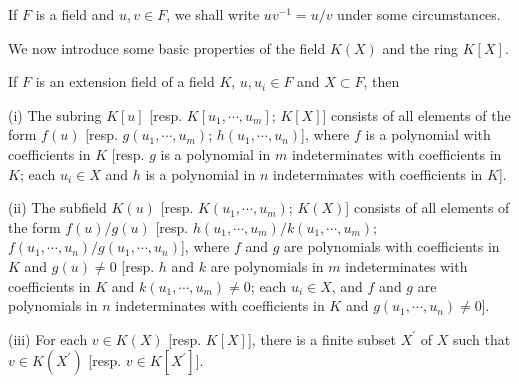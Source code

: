If $F$ is a field and $u,v\in F$, we shall write $uv^{-1}=u/v$ under some circumstances.\par
We now introduce some basic properties of the field $K(X)$ and the ring $K[X]$.
\begin{theorem}
If $F$ is an extension field of a field $K$, $u,u_i\in F$ and $X\subset F$, then \par
(i) The subring $K[u]$ [resp. $K[u_1,\cdots,u_m]$; $K[X]$] consists of all elements of the form $f(u)$ [resp. $g(u_1,\cdots,u_m)$; $h(u_1,\cdots,u_n)$], where $f$ is a polynomial with coefficients in $K$ [resp. $g$ is a polynomial in $m$ indeterminates with coefficients in $K$; each $u_i\in X$ and $h$ is a polynomial in $n$ indeterminates with coefficients in $K$].\par
(ii) The subfield $K(u)$ [resp. $K(u_1,\cdots,u_m)$; $K(X)$] consists of all elements of the form $f(u)/g(u)$ [resp. $h(u_1,\cdots,u_m)/k(u_1,\cdots,u_m)$; $f(u_1,\cdots,u_n)/g(u_1,\cdots,u_n)$], where $f$ and $g$ are polynomials with coefficients in $K$ and $g(u)\ne 0$ [resp. $h$ and $k$ are polynomials in $m$ indeterminates with coefficients in $K$ and $k(u_1,\cdots,u_m)\ne 0$; each $u_i\in X$, and $f$ and $g$ are polynomials in $n$ indeterminates with coefficients in $K$ and $g(u_1,\cdots,u_n)\ne 0$].\par
(iii) For each $v\in K(X)$ [resp. $K[X]$], there is a finite subset $X^\prime$ of $X$ such that $v\in K(X^\prime)$ [resp. $v\in K[X^\prime]$].
\end{theorem}
